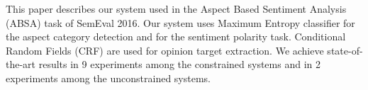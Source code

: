This paper describes our system used in the Aspect Based Sentiment Analysis (ABSA) task of SemEval 2016. Our system uses Maximum Entropy classifier for the aspect category detection and for the sentiment polarity task. Conditional Random Fields (CRF) are used for opinion target extraction. We achieve state-of-the-art results in 9 experiments among the constrained systems and in 2 experiments among the unconstrained systems.
